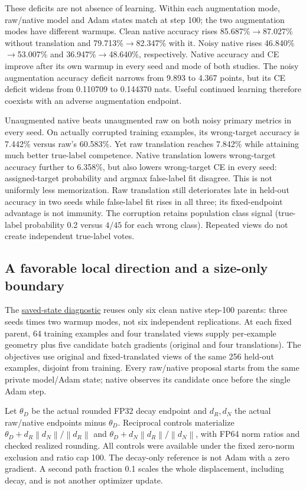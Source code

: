 \documentclass[10pt]{article}
\newcommand{\norm}[1]{\left\lVert#1\right\rVert}
\newcommand{\src}[2]{\href{../../../#1}{#2}}
\begin{document}
These deficits are not absence of learning. Within each augmentation mode, raw/native model and Adam states match at step 100; the two augmentation modes have different warmups. Clean native accuracy rises 85.687\%$\to$87.027\% without translation and 79.713\%$\to$82.347\% with it. Noisy native rises 46.840\%$\to$53.007\% and 36.947\%$\to$48.640\%, respectively. Native accuracy and CE improve after its own warmup in every seed and mode of both studies. The noisy augmentation accuracy deficit narrows from 9.893 to 4.367 points, but its CE deficit widens from 0.110709 to 0.144370 nats. Useful continued learning therefore coexists with an adverse augmentation endpoint.

Unaugmented native beats unaugmented raw on both noisy primary metrics in every seed. On actually corrupted training examples, its wrong-target accuracy is 7.442\% versus raw's 60.583\%. Yet raw translation reaches 7.842\% while attaining much better true-label competence. Native translation lowers wrong-target accuracy further to 6.358\%, but also lowers wrong-target CE in every seed: assigned-target probability and argmax false-label fit disagree. This is not uniformly less memorization. Raw translation still deteriorates late in held-out accuracy in two seeds while false-label fit rises in all three; its fixed-endpoint advantage is not immunity. The corruption retains population class signal (true-label probability 0.2 versus $4/45$ for each wrong class). Repeated views do not create independent true-label votes.

\subsection{A favorable local direction and a size-only boundary}
The \src{output/2026-09-10-spectral-augmentation-state/results.md}{saved-state diagnostic} reuses only six clean native step-100 parents: three seeds times two warmup modes, not six independent replications. At each fixed parent, 64 training examples and four translated views supply per-example geometry plus five candidate batch gradients (original and four translations). The objectives use original and fixed-translated views of the same 256 held-out examples, disjoint from training. Every raw/native proposal starts from the same private model/Adam state; native observes its candidate once before the single Adam step.

Let $\theta_D$ be the actual rounded FP32 decay endpoint and $d_R,d_N$ the actual raw/native endpoints minus $\theta_D$. Reciprocal controls materialize $\theta_D+d_R\norm{d_N}/\norm{d_R}$ and $\theta_D+d_N\norm{d_R}/\norm{d_N}$, with FP64 norm ratios and checked realized rounding. All controls were available under the fixed zero-norm exclusion and ratio cap 100. The decay-only reference is not Adam with a zero gradient. A second path fraction 0.1 scales the whole displacement, including decay, and is not another optimizer update.
\end{document}
